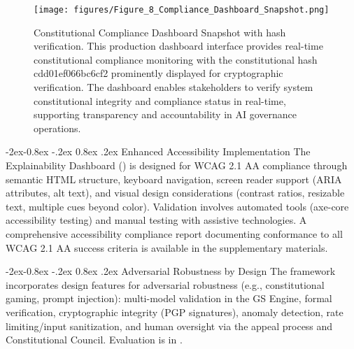 \documentclass[manuscript,screen,9pt]{acmart}
\makeatletter
\renewcommand\subsubsection{\@startsection{subsubsection}{3}{\z@}%
  {-2ex\@plus -0.8ex \@minus -.2ex}%
  {0.8ex \@plus .2ex}%
  {\normalfont\normalsize\bfseries}}
\makeatother
\begin{document}
\FloatBarrier %
\begin{figure}[!htb]
	\centering
	\texttt{[image: figures/Figure\_8\_Compliance\_Dashboard\_Snapshot.png]}
	\caption[Constitutional Compliance Dashboard Snapshot]{Constitutional Compliance Dashboard Snapshot with hash verification. This production dashboard interface provides real-time constitutional compliance monitoring with the constitutional hash cdd01ef066bc6cf2\cite{perf-report} prominently displayed for cryptographic verification. The dashboard enables stakeholders to verify system constitutional integrity and compliance status in real-time, supporting transparency and accountability in AI governance operations.}
	\label{fig:compliance_dashboard_snapshot}
\end{figure}

\subsubsection{Enhanced Accessibility Implementation}
\label{subsubsec:enhanced_accessibility}
The Explainability Dashboard () is designed for WCAG 2.1 AA compliance through semantic HTML structure, keyboard navigation, screen reader support (ARIA attributes, alt text), and visual design considerations (contrast ratios, resizable text, multiple cues beyond color). Validation involves automated tools (axe-core accessibility testing) and manual testing with assistive technologies. A comprehensive accessibility compliance report documenting conformance to all WCAG 2.1 AA success criteria is available in the supplementary materials.

\subsubsection{Adversarial Robustness by Design}
\label{subsubsec:adversarial_robustness_methods}
The framework incorporates design features for adversarial robustness (e.g., constitutional gaming, prompt injection): multi-model validation in the GS Engine, formal verification, cryptographic integrity (PGP signatures), anomaly detection, rate limiting/input sanitization, and human oversight via the appeal process and Constitutional Council. Evaluation is in .
\end{document}
